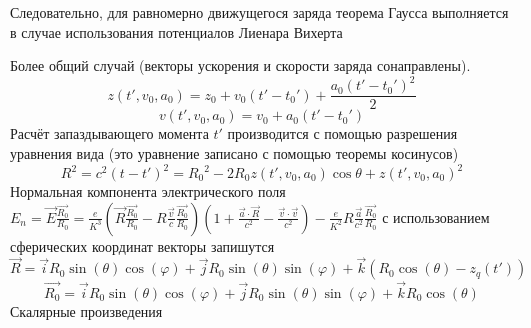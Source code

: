 \documentclass[11pt]{article}
\begin{document}
Следовательно, для равномерно движущегося заряда теорема Гаусса
выполняется в случае использования потенциалов Лиенара Вихерта

Более общий случай (векторы ускорения и скорости заряда сонаправлены).
\[z\left( t',{{v}_{0}},{{a}_{0}} \right)={{z}_{0}}+{{v}_{0}}\left( t'-{{t}_{0}}' \right)+\frac{{{a}_{0}}{{\left( t'-{{t}_{0}}' \right)}^{2}}}{2}\]
\[v\left( t',{{v}_{0}},{{a}_{0}} \right)={{v}_{0}}+{{a}_{0}}\left( t'-{{t}_{0}}' \right)\]
Расчёт запаздывающего момента \(t'\) производится с помощью разрешения
уравнения вида (это уравнение записано с помощью теоремы косинусов)
\[{{R}^{2}}={{c}^{2}}{{\left( t-t' \right)}^{2}}={{R}_{0}}^{2}-2{{R}_{0}}z\left( t',{{v}_{0}},{{a}_{0}} \right)\cos \theta +z{{\left( t',{{v}_{0}},{{a}_{0}} \right)}^{2}}\]
Нормальная компонента электрического поля
\({{E}_{n}}=\overrightarrow{E}\frac{\overrightarrow{{{R}_{0}}}}{{{R}_{0}}}=\frac{e}{{{K}^{3}}}\left( \overrightarrow{R}\frac{\overrightarrow{{{R}_{0}}}}{{{R}_{0}}}-R\frac{\overrightarrow{v}}{c}\frac{\overrightarrow{{{R}_{0}}}}{{{R}_{0}}} \right)\left( 1+\frac{\overrightarrow{a}\cdot \overrightarrow{R}}{{{c}^{2}}}-\frac{\overrightarrow{v}\cdot \overrightarrow{v}}{{{c}^{2}}} \right)-\frac{e}{{{K}^{2}}}R\frac{\overrightarrow{a}}{{{c}^{2}}}\frac{\overrightarrow{{{R}_{0}}}}{{{R}_{0}}}\)
с использованием сферических координат векторы запишутся
\[\overrightarrow{R}=\overrightarrow{i}{{R}_{0}}\sin \left( \theta  \right)\cos \left( \varphi  \right)+\overrightarrow{j}{{R}_{0}}\sin \left( \theta  \right)\sin \left( \varphi  \right)+\overrightarrow{k}\left( {{R}_{0}}\cos \left( \theta  \right)-{{z}_{q}}\left( t' \right) \right)\]
\[\overrightarrow{{{R}_{0}}}=\overrightarrow{i}{{R}_{0}}\sin \left( \theta  \right)\cos \left( \varphi  \right)+\overrightarrow{j}{{R}_{0}}\sin \left( \theta  \right)\sin \left( \varphi  \right)+\overrightarrow{k}{{R}_{0}}\cos \left( \theta  \right)\]
Скалярные произведения
\end{document}

